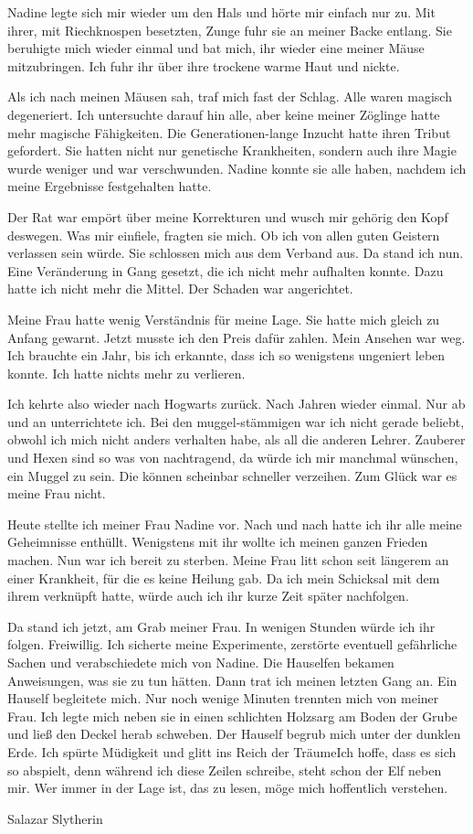 \begin{buch}
Nadine legte sich mir wieder um den Hals und hörte mir einfach nur zu. Mit ihrer, mit Riechknospen besetzten, Zunge fuhr sie an meiner Backe entlang. Sie beruhigte mich wieder einmal und bat mich, ihr wieder eine meiner Mäuse mitzubringen. Ich fuhr ihr über ihre trockene warme Haut und nickte.

Als ich nach meinen Mäusen sah, traf mich fast der Schlag. Alle waren magisch degeneriert. Ich untersuchte darauf hin alle, aber keine meiner Zöglinge hatte mehr magische Fähigkeiten. Die Generationen-lange Inzucht hatte ihren Tribut gefordert. Sie hatten nicht nur genetische Krankheiten, sondern auch ihre Magie wurde weniger und war verschwunden. Nadine konnte sie alle haben, nachdem ich meine Ergebnisse festgehalten hatte.

Der Rat war empört über meine Korrekturen und wusch mir gehörig den Kopf deswegen. Was mir einfiele, fragten sie mich. Ob ich von allen guten Geistern verlassen sein würde. Sie schlossen mich aus dem Verband aus. Da stand ich nun. Eine Veränderung in Gang gesetzt, die ich nicht mehr aufhalten konnte. Dazu hatte ich nicht mehr die Mittel. Der Schaden war angerichtet.

Meine Frau hatte wenig Verständnis für meine Lage. Sie hatte mich gleich zu Anfang gewarnt. Jetzt musste ich den Preis dafür zahlen. Mein Ansehen war weg. Ich brauchte ein Jahr, bis ich erkannte, dass ich so wenigstens ungeniert leben konnte. Ich hatte nichts mehr zu verlieren.

Ich kehrte also wieder nach Hogwarts zurück. Nach Jahren wieder einmal. Nur ab und an unterrichtete ich. Bei den muggel-stämmigen war ich nicht gerade beliebt, obwohl ich mich nicht anders verhalten habe, als all die anderen Lehrer. Zauberer und Hexen sind so was von nachtragend, da würde ich mir manchmal wünschen, ein Muggel zu sein. Die können scheinbar schneller verzeihen. Zum Glück war es meine Frau nicht.

Heute stellte ich meiner Frau Nadine vor. Nach und nach hatte ich ihr alle meine Geheimnisse enthüllt. Wenigstens mit ihr wollte ich meinen ganzen Frieden machen. Nun war ich bereit zu sterben. Meine Frau litt schon seit längerem an einer Krankheit, für die es keine Heilung gab. Da ich mein Schicksal mit dem ihrem verknüpft hatte, würde auch ich ihr kurze Zeit später nachfolgen.

Da stand ich jetzt, am Grab meiner Frau. In wenigen Stunden würde ich ihr folgen. Freiwillig. Ich sicherte meine Experimente, zerstörte eventuell gefährliche Sachen und verabschiedete mich von Nadine. Die Hauselfen bekamen Anweisungen, was sie zu tun hätten. Dann trat ich meinen letzten Gang an. Ein Hauself begleitete mich. Nur noch wenige Minuten trennten mich von meiner Frau. Ich legte mich neben sie in einen schlichten Holzsarg am Boden der Grube und ließ den Deckel herab schweben. Der Hauself begrub mich unter der dunklen Erde. Ich spürte Müdigkeit und glitt ins Reich der Träume\abs Ich hoffe, dass es sich so abspielt, denn während ich diese Zeilen schreibe, steht schon der Elf neben mir. Wer immer in der Lage ist, das zu lesen, möge mich hoffentlich verstehen.

Salazar Slytherin
\end{buch}

